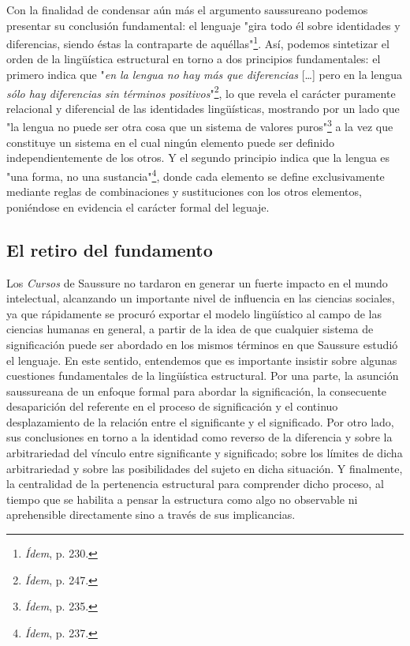 \documentclass{book}
\begin{document}
Con la finalidad de condensar aún más el argumento saussureano podemos
presentar su conclusión fundamental: el lenguaje "gira todo él sobre
identidades y diferencias, siendo éstas la contraparte de
aquéllas"\footnote{\emph{Ídem}, p. 230.}. Así, podemos sintetizar el
orden de la lingüística estructural en torno a dos principios
fundamentales: el primero indica que "\emph{en la lengua no hay más que
diferencias} {[}\ldots{]} pero en la lengua \emph{sólo hay diferencias
sin términos positivos}"\footnote{\emph{Ídem}, p. 247.}, lo que revela
el carácter puramente relacional y diferencial de las identidades
lingüísticas, mostrando por un lado que "la lengua no puede ser otra
cosa que un sistema de valores puros"\footnote{\emph{Ídem}, p. 235.} a
la vez que constituye un sistema en el cual ningún elemento puede ser
definido independientemente de los otros. Y el segundo principio indica
que la lengua es "una forma, no una sustancia"\footnote{\emph{Ídem}, p.
  237.}, donde cada elemento se define exclusivamente mediante reglas de
combinaciones y sustituciones con los otros elementos, poniéndose en
evidencia el carácter formal del leguaje.

\hypertarget{el-retiro-del-fundamento}{%
\subsection{El retiro del fundamento}\label{el-retiro-del-fundamento}}

Los \emph{Cursos} de Saussure no tardaron en generar un fuerte impacto
en el mundo intelectual, alcanzando un importante nivel de influencia en
las ciencias sociales, ya que rápidamente se procuró exportar el modelo
lingüístico al campo de las ciencias humanas en general, a partir de la
idea de que cualquier sistema de significación puede ser abordado en los
mismos términos en que Saussure estudió el lenguaje. En este sentido,
entendemos que es importante insistir sobre algunas cuestiones
fundamentales de la lingüística estructural. Por una parte, la asunción
saussureana de un enfoque formal para abordar la significación, la
consecuente desaparición del referente en el proceso de significación y
el continuo desplazamiento de la relación entre el significante y el
significado. Por otro lado, sus conclusiones en torno a la identidad
como reverso de la diferencia y sobre la arbitrariedad del vínculo entre
significante y significado; sobre los límites de dicha arbitrariedad y
sobre las posibilidades del sujeto en dicha situación. Y finalmente, la
centralidad de la pertenencia estructural para comprender dicho proceso,
al tiempo que se habilita a pensar la estructura como algo no observable
ni aprehensible directamente sino a través de sus implicancias.
\end{document}
